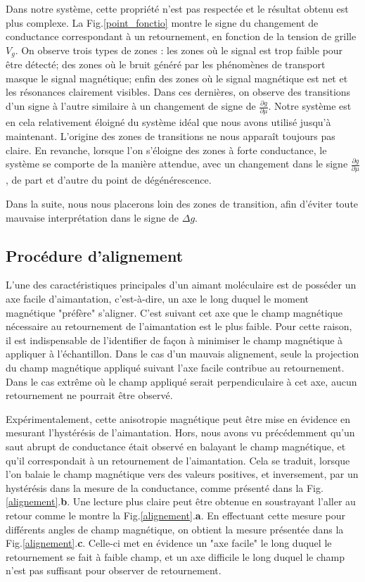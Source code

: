 Dans notre système, cette propriété n'est pas respectée et le résultat obtenu est plus complexe. La Fig.\ref{point_fonctio} montre le signe du changement de conductance correspondant à un retournement, en fonction de la tension de grille $V_g$. On observe trois types de zones : les zones où le signal est trop faible pour être détecté; des zones où le bruit généré par les phénomènes de transport masque le signal magnétique; enfin des zones où le signal magnétique est net et les résonances clairement visibles. Dans ces dernières, on observe des transitions d'un signe à l'autre similaire à un changement de signe de $\frac{\partial g}{\partial \mu}$. Notre système est en cela relativement éloigné du système idéal que nous avons utilisé jusqu'à maintenant. L'origine des zones de transitions ne nous apparaît toujours pas claire. En revanche, lorsque l'on s'éloigne des zones à forte conductance, le système se comporte de la manière attendue, avec un changement dans le signe $\frac{\partial g}{\partial \mu}$, de part et d'autre du point de dégénérescence.

Dans la suite, nous nous placerons loin des zones de transition, afin d'éviter toute mauvaise interprétation dans le signe de $\Delta g$.


\subsection{Procédure d'alignement}

L'une des caractéristiques principales d'un aimant moléculaire est de posséder un axe facile d'aimantation, c'est-à-dire, un axe le long duquel le moment magnétique "préfère" s'aligner. C'est suivant cet axe que le champ magnétique nécessaire au retournement de l'aimantation est le plus faible. Pour cette raison, il est indispensable de l'identifier de façon à minimiser le champ magnétique à appliquer à l'échantillon. Dans le cas d'un mauvais alignement, seule la projection du champ magnétique appliqué suivant l'axe facile contribue au retournement. Dans le cas extrême où le champ appliqué serait perpendiculaire à cet axe, aucun retournement ne pourrait être observé.

Expérimentalement, cette anisotropie magnétique peut être mise en évidence en mesurant l'hystérésis de l'aimantation. Hors, nous avons vu précédemment qu'un saut abrupt de conductance était observé en balayant le champ magnétique, et qu'il correspondait à un retournement de l'aimantation. Cela se traduit, lorsque l'on balaie le champ magnétique vers des valeurs positives, et inversement, par un hystérésis dans la mesure de la conductance, comme présenté dans la Fig.\ref{alignement}.\textbf{b}. Une lecture plus claire peut être obtenue en soustrayant l'aller au retour comme le montre la Fig.\ref{alignement}.\textbf{a}. En effectuant cette mesure pour différents angles de champ magnétique, on obtient la mesure présentée dans la Fig.\ref{alignement}.\textbf{c}. Celle-ci met en évidence un "axe facile" le long duquel le retournement se fait à faible champ, et un axe difficile le long duquel le champ n'est pas suffisant pour observer de retournement.

